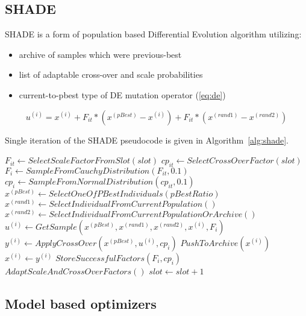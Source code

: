 \documentclass[sigconf]{acmart}
\begin{document}
\subsection{SHADE}

SHADE is a form of population based Differential Evolution algorithm utilizing:
\begin{itemize}
	\item archive of samples which were previous-best
	\item list of adaptable cross-over and scale probabilities
	\item current-to-pbest type of DE mutation operator (\ref{eq:de}) 
\end{itemize}

\begin{equation}
	u^{(i)} = x^{(i)} + F_{it} * (x^{(pBest)} - x^{(i)}) + F_{it} * (x^{(rand1)} - x^{(rand2)})
	\label{eq:de}
\end{equation}

Single iteration of the SHADE pseudocode is given in Algorithm~\ref{alg:shade}.

\begin{algorithm}[ht]
	\begin{algorithmic}[1]
	\footnotesize
	\State $F_{it} \gets SelectScaleFactorFromSlot(slot)$
	\State $cp_{it} \gets SelectCrossOverFactor(slot)$
		\State $F_{i} \gets SampleFromCauchyDistribution(F_{it}, 0.1)$
		\State $cp_{i} \gets SampleFromNormalDistribution(cp_{it}, 0.1)$
		\State $x^{(pBest)} \gets SelectOneOfPBestIndividuals(pBestRatio)$
		\State $x^{(rand1)} \gets SelectIndividualFromCurrentPopulation()$
		\State $x^{(rand2)} \gets SelectIndividualFromCurrentPopulationOrArchive()$
		\State $u^{(i)} \gets GetSample(x^{(pBest)}, x^{(rand1)}, x^{(rand2)}, x^{(i)}, F_{i})$
		\State $y^{(i)} \gets ApplyCrossOver(x^{(pBest)}, u^{(i)}, cp_{i})$
			\State $PushToArchive(x^{(i)})$
			\State $x^{(i)} \gets y^{(i)}$
			\State $StoreSuccessfulFactors(F_{i}, cp_{i})$
		\EndIf
	\EndFor
	\State $AdaptScaleAndCrossOverFactors()$
	\State $slot \gets slot + 1$
\caption{Single iteration of SHADE%
  \label{alg:shade}}
  \end{algorithmic}
  \end{algorithm}


\subsection{Model based optimizers}
\end{document}
